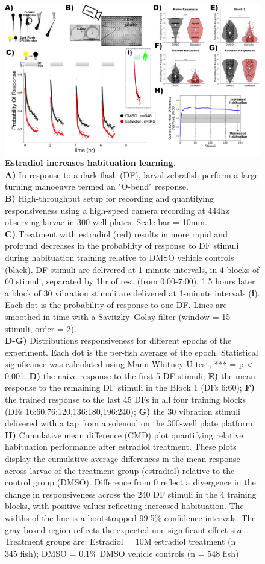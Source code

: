 \documentclass[9.5pt,lineno]{RandlettLab_elife}
\begin{document}
\begin{figure}
\begin{fullwidth}
\begin{center}
\includegraphics[width=0.65\linewidth]{figures/EstradiolEffect.png}
\caption{\textbf{Estradiol increases habituation learning.} \scriptsize
\\ \textbf{A)} In response to a dark flash (DF), larval zebrafish perform a large turning manoeuvre termed an "O-bend" response.
\\ \textbf{B)} High-throughput setup for recording and quantifying responsiveness using a high-speed camera recording at 444hz observing larvae in 300-well plates. Scale bar = 10mm.
\\ \textbf{C)} Treatment with estradiol (red) results in more rapid and profound decreases in the probability of response to DF stimuli during habituation training relative to DMSO vehicle controls (black). DF stimuli are delivered at 1-minute intervals, in 4 blocks of 60 stimuli, separated by 1hr of rest (from 0:00-7:00). 1.5 hours later a block of 30 vibration stimuli are delivered at 1-minute intervals (\textbf{i}). Each dot is the probability of response to one DF. Lines are smoothed in time with a Savitzky–Golay filter (window = 15 stimuli, order = 2). 
\\ \textbf{D-G)} Distributions responsiveness for different epochs of the experiment. Each dot is the per-fish average of the epoch. Statistical significance was calculated using Mann-Whitney U test, *** = p < 0.001.  \textbf{D)} the naive response to the first 5 DF stimuli; \textbf{E)} the mean response to the remaining DF stimuli in the Block 1 (DFs 6:60); \textbf{F)} the trained response to the last 45 DFs in all four training blocks (DFs 16:60,76:120,136:180,196:240); \textbf{G)} the 30 vibration stimuli delivered with a tap from a solenoid on the 300-well plate platform. 
\\ \textbf{H)} Cumulative mean difference (CMD) plot quantifying relative habituation performance after estradiol treatment. These plots display the cumulative average differences in the mean response across larvae of the treatment group (estradiol) relative to the control group (DMSO). Difference from 0 reflect a divergence in the change in responsiveness across the 240 DF stimuli in the 4 training blocks, with positive values reflecting increased habituation. The widths of the line is a bootstrapped 99.5\% confidence intervals. The gray boxed region reflects the expected non-significant effect size \citep{Randlett2019-fj}.
\\ Treatment groups are: Estradiol = 10\textmu M estradiol treatment (n = 345 fish); DMSO = 0.1\% DMSO vehicle controls (n = 548 fish)
}


\end{center}
\end{fullwidth}
\end{figure}
\end{document}

